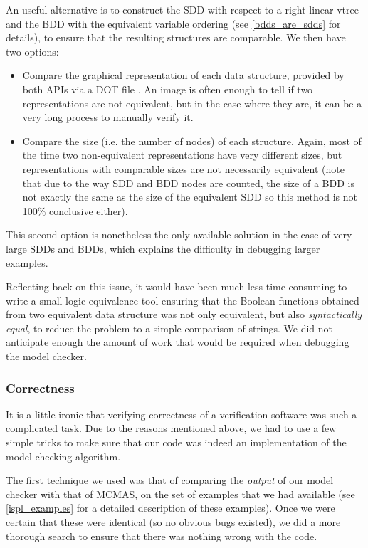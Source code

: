 \documentclass[11pt]{article}
\begin{document}
An useful alternative is to construct the SDD with respect to a right-linear vtree and the BDD with the equivalent variable ordering (see \ref{bdds_are_sdds} for details), to ensure that the resulting structures are comparable. We then have two options:
\begin{itemize}

\item Compare the graphical representation of each data structure, provided by both APIs via a DOT file \cite{dot}. An image is often enough to tell if two representations are not equivalent, but in the case where they are, it can be a very long process to manually verify it.
\item Compare the size (i.e. the number of nodes) of each structure. Again, most of the time two non-equivalent representations have very different sizes, but representations with comparable sizes are not necessarily equivalent (note that due to the way SDD and BDD nodes are counted, the size of a BDD is not exactly the same as the size of the equivalent SDD so this method is not 100\% conclusive either).

\end{itemize}
 This second option is nonetheless the only available solution in the case of very large SDDs and BDDs, which explains the difficulty in debugging larger examples.

Reflecting back on this issue, it would have been much less time-consuming to write a small logic equivalence tool ensuring that the Boolean functions obtained from two equivalent data structure was not only equivalent, but also \textit{syntactically equal}, to reduce the problem to a simple comparison of strings. We did not anticipate enough the amount of work that would be required when debugging the model checker.

\subsubsection{Correctness}

It is a little ironic that verifying correctness of a verification software was such a complicated task. Due to the reasons mentioned above, we had to use a few simple tricks to make sure that our code was indeed an implementation of the model checking algorithm. 

The first technique we used was that of comparing the \textit{output} of our model checker with that of MCMAS, on the set of examples that we had available (see \ref{ispl_examples} for a detailed description of these examples). Once we were certain that these were identical (so no obvious bugs existed), we did a more thorough search to ensure that there was nothing wrong with the code. 
\end{document}
